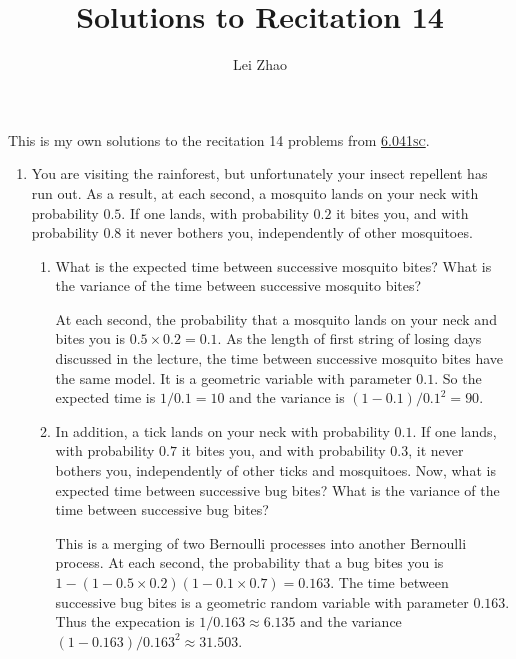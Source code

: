 

\title{Solutions to Recitation 14}
\author{Lei Zhao}


\maketitle

This is my own solutions to the recitation 14 problems from
\href{https://ocw.mit.edu/courses/electrical-engineering-and-computer-science/6-041sc-probabilistic-systems-analysis-and-applied-probability-fall-2013/unit-iii/lecture-13/}{6.041\textsc{sc}}.

\begin{enumerate}
\item You are visiting the rainforest, but unfortunately your insect
  repellent has run out.  As a result, at each second, a mosquito
  lands on your neck with probability \(0.5\).  If one lands, with
  probability \(0.2\) it bites you, and with probability \(0.8\) it
  never bothers you, independently of other mosquitoes.

  \begin{enumerate} \parasp
  \item What is the expected time between successive mosquito bites?
    What is the variance of the time between successive mosquito
    bites?

    At each second, the probability that a mosquito lands on your neck
    and bites you is \(0.5 \times 0.2 = 0.1\).  As the length of first
    string of losing days discussed in the lecture, the time between
    successive mosquito bites have the same model.  It is a geometric
    variable with parameter \(0.1\). So the expected time is
    \(1/0.1 = 10\) and the variance is \((1-0.1)/0.1^2 = 90\).

  \item In addition, a tick lands on your neck with probability
    \(0.1\).  If one lands, with probability \(0.7\) it bites you, and
    with probability \(0.3\), it never bothers you, independently of
    other ticks and mosquitoes.  Now, what is expected time between
    successive bug bites?  What is the variance of the time between
    successive bug bites?

    This is a merging of two Bernoulli processes into another Bernoulli
    process.  At each second, the probability that a bug bites you is
    \(1 - (1 - 0.5 \times 0.2)(1 - 0.1 \times 0.7) = 0.163\).  The time
    between successive bug bites is a geometric random variable with
    parameter \(0.163\).  Thus the expecation is \(1/0.163 \approx 6.135\)
    and the variance \((1-0.163)/0.163^2 \approx 31.503\).
  \end{enumerate}


\end{enumerate}
